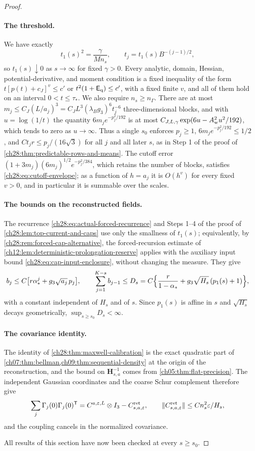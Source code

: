 \begin{proof}
\paragraph{The threshold.}
We have exactly
\[
 t_1(s)^2=\frac\gamma{Mn_s},\qquad t_j=t_1(s)B^{-(j-1)/2},
\]
so $t_1(s)\downarrow0$ as $s\to\infty$ for fixed $\gamma>0$. Every analytic, domain, Hessian, potential-derivative, and moment condition is a fixed inequality of the form $t[p(t)+c_J]^v\le c'$ or $t^2(1+\mathsf E_{\rm q})\le c'$, with a fixed finite $v$, and all of them hold on an interval $0<t\le\tau_*$. We also require $n_s\ge n_\Gamma$. There are at most $m_j\le C_J(L/a_j)^3=C_JL^3(\lambda_Bg_3)^6t_j^{-6}$ three-dimensional blocks, and with $u=\log(1/t)$ the quantity $6m_je^{-p_j^2/192}$ is at most $C_{J,L,\gamma}\exp(6u-A_{\rm w}^2u^2/192)$, which tends to zero as $u\to\infty$. Thus a single $s_0$ enforces $p_j\ge1$, $6m_je^{-p_j^2/192}\le1/2$, and $Ct_jr\le p_j/(16\sqrt3)$ for all $j$ and all later $s$, as in Step 1 of the proof of \cref{ch28:thm:predictable-rows-and-means}. The cutoff error $(1+3m_j)(6m_j)^{1/2}e^{-p_j^2/384}$, which retains the number of blocks, satisfies \eqref{ch28:eq:cutoff-envelope}; as a function of $h=a_j$ it is $O(h^v)$ for every fixed $v>0$, and in particular it is summable over the scales.

\paragraph{The bounds on the reconstructed fields.}
The recurrence \eqref{ch28:eq:actual-forced-recurrence} and Steps 1--4 of the proof of \cref{ch28:lem:top-current-and-caps} use only the smallness of $t_1(s)$; equivalently, by \cref{ch28:rem:forced-cap-alternative}, the forced-recursion estimate of \cref{ch12:lem:deterministic-prolongation-reserve} applies with the auxiliary input bound \eqref{ch28:eq:cap-input-enclosure}, without changing the measure. They give
\[
 b_j\le C\bigl[r\alpha_*^j+g_3\sqrt{a_j}\,p_j\bigr],\qquad \sum_{j=1}^{K-s}b_{j-1}\le D_s=C\Bigl\{\frac r{1-\alpha_*}+g_3\sqrt{H_s}\,(p_1(s)+1)\Bigr\},
\]
with a constant independent of $H_s$ and of $s$. Since $p_1(s)$ is affine in $s$ and $\sqrt{H_s}$ decays geometrically, $\sup_{s\ge s_0}D_s<\infty$.

\paragraph{The covariance identity.}
The identity of \cref{ch28:thm:maxwell-calibration} is the exact quadratic part of \cref{ch07:thm:bellman,ch09:thm:sequential-density} at the origin of the reconstruction, and the bound on $\mathbf H_{s,a}^{-1}$ comes from \cref{ch05:thm:flat-precision}. The independent Gaussian coordinates and the coarse Schur complement therefore give
\[
 \sum_j\Gamma_j(0)\Gamma_j(0)^{\mathsf T}=C^{a,\varepsilon,L}\otimes I_3-C^{\rm ret}_{s,a,\varepsilon},\qquad \|C^{\rm ret}_{s,a,\varepsilon}\|\le Cn_s^2\varepsilon/H_s,
\]
and the coupling cancels in the normalized covariance.

All results of this section have now been checked at every $s\ge s_0$.
\end{proof}
